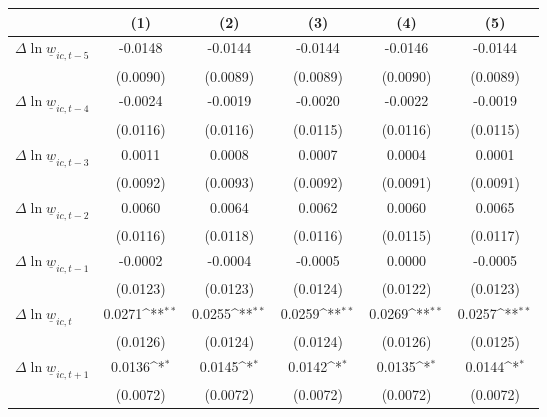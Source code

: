 {
\def\sym#1{\ifmmode^{#1}\else\(^{#1}\)\fi}
\begin{tabular}{l*{5}{c}}
\hline\hline
          &\multicolumn{1}{c}{(1)}         &\multicolumn{1}{c}{(2)}         &\multicolumn{1}{c}{(3)}         &\multicolumn{1}{c}{(4)}         &\multicolumn{1}{c}{(5)}         \\
\hline
$\Delta \ln \underline{w}_{ic,t-5}$&  -0.0148         &  -0.0144         &  -0.0144         &  -0.0146         &  -0.0144         \\
          & (0.0090)         & (0.0089)         & (0.0089)         & (0.0090)         & (0.0089)         \\
[1em]
$\Delta \ln \underline{w}_{ic,t-4}$&  -0.0024         &  -0.0019         &  -0.0020         &  -0.0022         &  -0.0019         \\
          & (0.0116)         & (0.0116)         & (0.0115)         & (0.0116)         & (0.0115)         \\
[1em]
$\Delta \ln \underline{w}_{ic,t-3}$&   0.0011         &   0.0008         &   0.0007         &   0.0004         &   0.0001         \\
          & (0.0092)         & (0.0093)         & (0.0092)         & (0.0091)         & (0.0091)         \\
[1em]
$\Delta \ln \underline{w}_{ic,t-2}$&   0.0060         &   0.0064         &   0.0062         &   0.0060         &   0.0065         \\
          & (0.0116)         & (0.0118)         & (0.0116)         & (0.0115)         & (0.0117)         \\
[1em]
$\Delta \ln \underline{w}_{ic,t-1}$&  -0.0002         &  -0.0004         &  -0.0005         &   0.0000         &  -0.0005         \\
          & (0.0123)         & (0.0123)         & (0.0124)         & (0.0122)         & (0.0123)         \\
[1em]
$\Delta \ln \underline{w}_{ic,t}$&   0.0271\sym{**} &   0.0255\sym{**} &   0.0259\sym{**} &   0.0269\sym{**} &   0.0257\sym{**} \\
          & (0.0126)         & (0.0124)         & (0.0124)         & (0.0126)         & (0.0125)         \\
[1em]
$\Delta \ln \underline{w}_{ic,t+1}$&   0.0136\sym{*}  &   0.0145\sym{*}  &   0.0142\sym{*}  &   0.0135\sym{*}  &   0.0144\sym{*}  \\
          & (0.0072)         & (0.0072)         & (0.0072)         & (0.0072)         & (0.0072)         \\

\end{tabular}}
